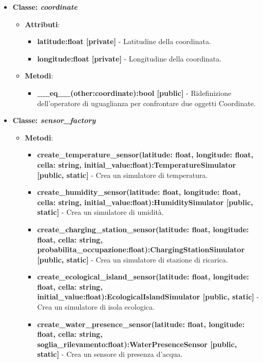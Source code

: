 \begin{itemize}
\begin{itemize}
\begin{itemize}
    \end{itemize}
\end{itemize}
    \item{\textbf{Classe: \textit{coordinate}}}
    \begin{itemize}
        \item    \textbf{Attributi}: 
    \begin{itemize}
        \item \textbf{latitude:float [private]} - Latitudine della coordinata.
        \item \textbf{longitude:float [private]} - Longitudine della coordinata.
    \end{itemize}
    \item     \textbf{Metodi}: 
    \begin{itemize}
        \item \textbf{\_\_eq\_\_(other:coordinate):bool [public]} - Ridefinizione dell'operatore di uguaglianza per confrontare due oggetti Coordinate.
    \end{itemize}
\end{itemize}
    \item{\textbf{Classe: \textit{sensor\_factory}}}
    \begin{itemize}
        \item    \textbf{Metodi}: 
\begin{itemize}
    \item \textbf{create\_temperature\_sensor(latitude: float, longitude: float, cella: string, initial\_value:float):TemperatureSimulator [public, static]} - Crea un simulatore di temperatura.
    \item \textbf{create\_humidity\_sensor(latitude: float, longitude: float, cella: string, initial\_value:float):HumiditySimulator [public, static]} - Crea un simulatore di umidità.
    \item \textbf{create\_charging\_station\_sensor(latitude: float, longitude: float, cella: string, probabilita\_occupazione:float):ChargingStationSimulator [public, static]} - Crea un simulatore di stazione di ricarica.
    \item \textbf{create\_ecological\_island\_sensor(latitude: float, longitude: float, cella: string, initial\_value:float):EcologicalIslandSimulator [public, static]} - Crea un simulatore di isola ecologica.
    \item \textbf{create\_water\_presence\_sensor(latitude: float, longitude: float, cella: string, soglia\_rilevamento:float):WaterPresenceSensor [public, static]} - Crea un sensore di presenza d'acqua.

\end{itemize}
\end{itemize}
\end{itemize}
